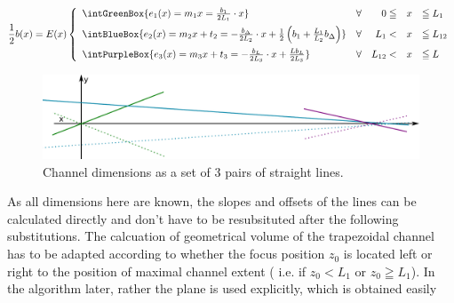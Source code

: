 \begin{align}
  \frac{1}{2}b(x) = E(x) \left\{  
  \begin{array}{lcrcl}
    \intGreenBox {\ensuremath{ e_1(x) = m_1 x       = \frac{b_1}{2L_1} \cdot x   }}
    & \forall & 0 \leqq & x &\leqq L_1 \\\addlinespace %
    \intBlueBox {\ensuremath{ e_2(x) = m_2 x + t_2  = - \frac{\bDelta}{2 L_2} \cdot x  + \frac{1}{2} \left( b_1 +  
    \frac{L_1}{L_2}\bDelta \right)     }}
    & \forall & L_1 < & x &\leqq L_{12}  \\\addlinespace  %
    \intPurpleBox {\ensuremath{ e_3(x) = m_3 x + t_3  = - \frac{\bL}{2L_3}  \cdot x + \frac{L \bL}{2 L_3 } }}
    & \forall & L_{12} < & x &\leqq L   \\ %
  \end{array}
  \right.
  \label{eq:chLine}
\end{align}
\begin{figure}  
  \begin{center}
    \includegraphics[width=\linewidth]{./images/fffChannelCoordSys.pdf}    
  \end{center}
  \caption[Channel dimensions as a set of straight lines]{Channel dimensions as a set of 3 pairs of straight lines.}
  \label{fig:fffChannelCoordSys} 
\end{figure}
As all dimensions here are known, the slopes and offsets of the lines can be calculated directly and don't have to be resubsituted after the following substitutions.
The calcuation of geometrical volume of the trapezoidal channel has to be adapted according to whether the focus 
position $z_0$ is located left or right to the position of maximal channel extent ( i.e. if $z_0 < L_1$ or $z_0 \geqq 
L_1$). In the algorithm later, rather the plane is used explicitly, which is obtained easily \clearpage

